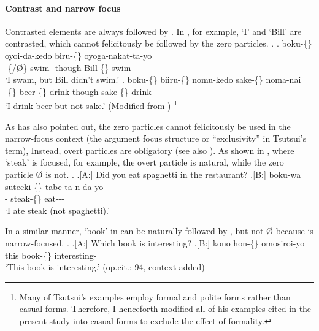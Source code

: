\paragraph{Contrast and narrow focus}

Contrasted elements are always followed by  \cite[53ff.]{tsutsui84}.
In \Next[a], for example,
 `I' and  `Bill' are contrasted,
which cannot felicitously be followed by the zero particles.
%
\ex.
 \ag. boku-\{\} oyoi-da-kedo biru-\{\} oyoga-nakat-ta-yo \\
      -\{/{\O}\} swim--though Bill-\{\} swim--- \\
      `I swam, but Bill didn't swim.'
 \bg. boku-\{\} biiru-\{\} nomu-kedo sake-\{\} noma-nai \\
      -\{\} beer-\{\} drink-though sake-\{\} drink- \\
      `I drink beer but not sake.'
      \hfill{(Modified from )}%
      \footnote{
      Many of Tsutsui's examples employ formal and polite forms
      rather than casual forms.
      Therefore, I henceforth modified all of his examples cited
      in the present study into casual forms
      to exclude the effect of formality.
      }


As  has also pointed out,
the zero particles cannot felicitously be used
in the narrow-focus context
(the argument focus structure or ``exclusivity'' in Tsutsui's term),
Instead, overt particles are obligatory
(see also ).
As shown in \Next[B], where  `steak' is focused, for example,
the overt particle  is natural,
while the zero particle {\O} is not.
%
\ex.
 \a.[A:] Did you eat spaghetti in the restaurant?
 \bg.[B:] boku-wa suteeki-\{\} tabe-ta-n-da-yo \\
          - steak-\{\} eat--- \\
          `I ate steak (not spaghetti).'
          \hfill{\cite[93, context added]{tsutsui84}}

In a similar manner,
 `book' in \Next[B] can be naturally followed by ,
but not {\O}
because  is narrow-focused.
%
\ex.
 \a.[A:] Which book is interesting?
 \bg.[B:] kono hon-\{\} omosiroi-yo \\
          this book-\{\} interesting- \\
          `This book is interesting.'
          \hfill{(op.cit.: 94, context added)}

